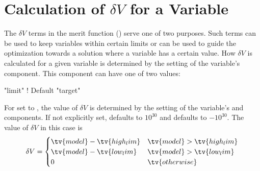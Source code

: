 \section{Calculation of $\delta V$ for a Variable}
\label{s:del.v}

The $\delta V$ terms in the merit function () serve one of two purposes. Such terms can be
used to keep variables within certain limits or can be used to guide the optimization towards a
solution where a variable has a certain value. How $\delta V$ is calculated for a given variable is
determined by the setting of the variable's  component. This component can
have one of two values:
\begin{example}
  "limit"     ! Default
  "target"
\end{example}

For  set to , the value of $\delta V$ is determined by the setting of the
variable's  and  components. If not explicitly set,  defaults
to $10^{30}$ and  defaults to $-10^{30}$. The value of $\delta V$ in this case is
\begin{equation}
  \delta V = 
  \begin{cases}
    \tv{model} - \tv{high_lim} & \tv{model} > \tv{high_lim} \\
    \tv{model} - \tv{low_lim} & \tv{model} > \tv{low_lim} \\
    0 & \tv{otherwise}
  \end{cases}
\end{equation}

